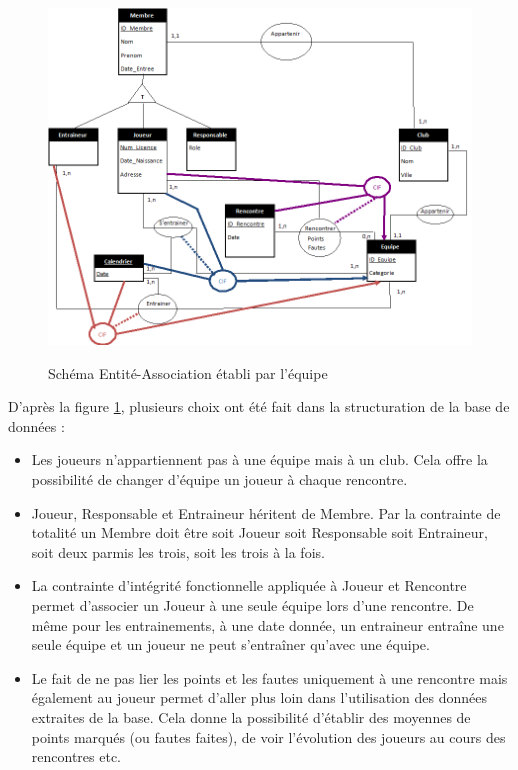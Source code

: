\documentclass[a4paper»,8pt,french,fleqn]{report}
\begin{document}
\begin{figure}[h]
  \centering
    \includegraphics[scale=0.7]{Schema_EA.png}
    \label{fig:schema_ea}
    \caption{Schéma Entité-Association établi par l'équipe}
\end{figure}

D'après la figure \ref{fig:schema_ea}, plusieurs choix ont été fait dans la structuration de la base de données : \\

\begin{itemize}

\item Les joueurs n'appartiennent pas à une équipe mais à un club. Cela offre la possibilité de changer d'équipe un joueur à chaque rencontre. \\

\item Joueur, Responsable et Entraineur héritent de Membre. Par la contrainte de totalité un Membre doit être soit Joueur soit Responsable soit Entraineur, soit deux parmis les trois, soit les trois à la fois.\\

\item La contrainte d'intégrité fonctionnelle appliquée à Joueur et Rencontre permet d'associer un Joueur à une seule équipe lors d'une rencontre. De même pour les entrainements, à une date donnée, un entraineur entraîne une seule équipe et un joueur ne peut s'entraîner qu'avec une équipe.

\item Le fait de ne pas lier les points et les fautes uniquement à une rencontre mais également au joueur permet d'aller plus loin dans l'utilisation des données extraites de la base. Cela donne la possibilité d'établir des moyennes de points marqués (ou fautes faites), de voir l'évolution des joueurs au cours des rencontres etc.  

\end{itemize}
\end{document}
